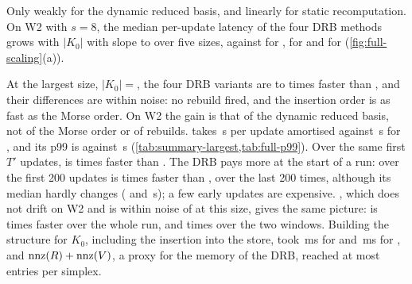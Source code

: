 Only weakly for the dynamic reduced basis, and linearly for static
recomputation. On W2 with $s=8$, the median per-update latency of the four DRB
methods grows with $|K_0|$ with slope \NumSlopeEOneWTwoSEightMmhmMed{} to
\NumSlopeEOneWTwoSEightDrbIdMed{} over five sizes, against
\NumSlopeEOneWTwoSEightFullIdMed{} for ,
\NumSlopeEOneWTwoSEightGudhiMed{} for  and
\NumSlopeEOneWTwoSEightFullMorseMed{} for 
(\cref{fig:full-scaling}(a)).

At the largest size, $|K_0|={}$\NumWTwoNThirtyThreeSEightSize, the four DRB
variants are \NumWTwoNThirtyThreeSEightDrbSpeedupFullIdMin{} to
\NumWTwoNThirtyThreeSEightDrbSpeedupFullIdMax{} times faster than
, and their differences are within noise: no rebuild fired, and
the insertion order is as fast as the Morse order. On W2 the gain is that of the
dynamic reduced basis, not of the Morse order or of rebuilds.  takes
\NumWTwoNThirtyThreeSEightMmhmAmort\,\textmu s per update amortised against
\NumWTwoNThirtyThreeSEightFullIdAmort\,\textmu s for , and its
p99 is \NumWTwoNThirtyThreeSEightMmhmPNinetyNine{} against
\NumWTwoNThirtyThreeSEightFullIdPNinetyNine\,\textmu s
(\cref{tab:summary-largest,tab:full-p99}). Over the same first $T'$ updates,
 is \NumWTwoNThirtyThreeSEightMmhmSpeedupGudhi{} times faster than
. The DRB pays more at the start of a run: over the first 200
updates  is \NumWTwoNThirtyThreeSEightMmhmSpeedupFullIdFirstBlock{}
times faster than , over the last 200
\NumWTwoNThirtyThreeSEightMmhmSpeedupFullIdLastBlock{} times, although its median
hardly changes (\NumWTwoNThirtyThreeSEightMmhmFirstBlockMed{} and
\NumWTwoNThirtyThreeSEightMmhmLastBlockMed\,\textmu s); a few early updates are
expensive. , which does not drift on W2 and is within noise
of  at this size, gives the same picture:  is
\NumWTwoNThirtyThreeSEightMmhmSpeedupFullSorted{} times faster over the whole
run, \NumWTwoNThirtyThreeSEightMmhmSpeedupFullSortedFirstBlock{} and
\NumWTwoNThirtyThreeSEightMmhmSpeedupFullSortedLastBlock{} times over the two
windows. Building the structure for $K_0$, including the insertion into the
store, took \NumWTwoNThirtyThreeSEightMmhmInitMs\,ms for  and
\NumWTwoNThirtyThreeSEightFullIdInitMs\,ms for , and
$\operatorname{nnz}(R)+\operatorname{nnz}(V)$, a proxy for the memory of the DRB, reached at most
\NumWTwoNThirtyThreeSEightMmhmNnzPerSimplex{} entries per simplex.

